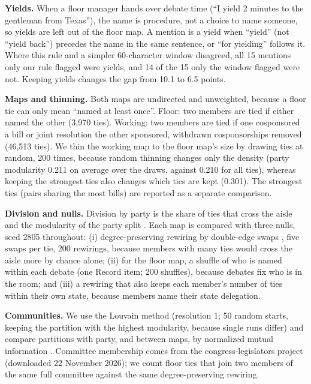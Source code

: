 \documentclass[9pt,twocolumn,twoside]{pnas-new}
\begin{document}
{\textbf{Yields.} When a floor manager hands over debate time (``I yield 2 minutes to the gentleman from Texas''),
the name is procedure, not a choice to name someone, so yields are left out of the floor map. A mention is a yield
when ``yield'' (not ``yield back'') precedes the name in the same sentence, or ``for yielding'' follows it. Where this
rule and a simpler 60-character window disagreed, all 15 mentions only our rule flagged were yields, and 14 of the
15 only the window flagged were not. Keeping yields changes the gap from 10.1 to 6.5 points.

\textbf{Maps and thinning.} Both maps are undirected and unweighted, because a floor tie can only mean ``named at
least once''. Floor: two members are tied if either named the other (3,970 ties). Working: two members are tied if
one cosponsored a bill or joint resolution the other sponsored, withdrawn cosponsorships removed (46,513 ties). We
thin the working map to the floor map's size by drawing ties at random, 200 times, because random thinning changes
only the density (party modularity 0.211 on average over the draws, against 0.210 for all ties), whereas keeping
the strongest ties also changes which ties are kept (0.301). The strongest ties (pairs sharing the most bills) are reported as a separate comparison.

\textbf{Division and nulls.} Division by party is the share of ties that cross the aisle and the modularity of the
party split \cite{newman2006}. Each map is compared with three nulls, seed 2805 throughout: (i) degree-preserving
rewiring by double-edge swaps \cite{maslov2002}, five swaps per tie, 200 rewirings, because members with many ties
would cross the aisle more by chance alone; (ii) for the floor map, a shuffle of who is named within each debate
(one Record item; 200 shuffles), because debates fix who is in the room; and (iii) a rewiring that also keeps each
member's number of ties within their own state, because members name their state delegation.

\textbf{Communities.} We use the Louvain method \cite{blondel2008} (resolution 1; 50 random starts, keeping the
partition with the highest modularity, because single runs differ) and compare partitions with party, and between
maps, by normalized mutual information \cite{danon2005}. Committee membership comes from the congress-legislators
project (downloaded 22 November 2026); we count floor ties that join two members of the same full committee against
the same degree-preserving rewiring.

}
\end{document}
